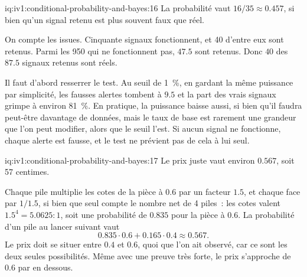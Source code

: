 \begin{solution}{iq:iv1:conditional-probability-and-bayes:16}
La probabilité vaut $16/35 \approx 0.457$, si bien qu'un signal retenu est plus souvent faux que réel.

On compte les issues. Cinquante signaux fonctionnent, et 40 d'entre eux sont retenus. Parmi les 950 qui ne fonctionnent pas, $47.5$ sont retenus. Donc $40$ des $87.5$ signaux retenus sont réels.

Il faut d'abord resserrer le test. Au seuil de 1~\%, en gardant la même puissance par simplicité, les fausses alertes tombent à $9.5$ et la part des vrais signaux grimpe à environ 81~\%. En pratique, la puissance baisse aussi, si bien qu'il faudra peut-être davantage de données, mais le taux de base est rarement une grandeur que l'on peut modifier, alors que le seuil l'est. Si aucun signal ne fonctionne, chaque alerte est fausse, et le test ne prévient pas de cela à lui seul.

\end{solution}

\begin{solution}{iq:iv1:conditional-probability-and-bayes:17}
Le prix juste vaut environ $0.567$, soit 57 centimes.

Chaque pile multiplie les cotes de la pièce à $0.6$ par un facteur $1.5$, et chaque face par $1/1.5$, si bien que seul compte le nombre net de 4 piles~: les cotes valent $1.5^4 = 5.0625 : 1$, soit une probabilité de $0.835$ pour la pièce à $0.6$. La probabilité d'un pile au lancer suivant vaut
\[
0.835 \cdot 0.6 + 0.165 \cdot 0.4 \approx 0.567.
\]
Le prix doit se situer entre $0.4$ et $0.6$, quoi que l'on ait observé, car ce sont les deux seules possibilités. Même avec une preuve très forte, le prix s'approche de $0.6$ par en dessous.

\end{solution}

